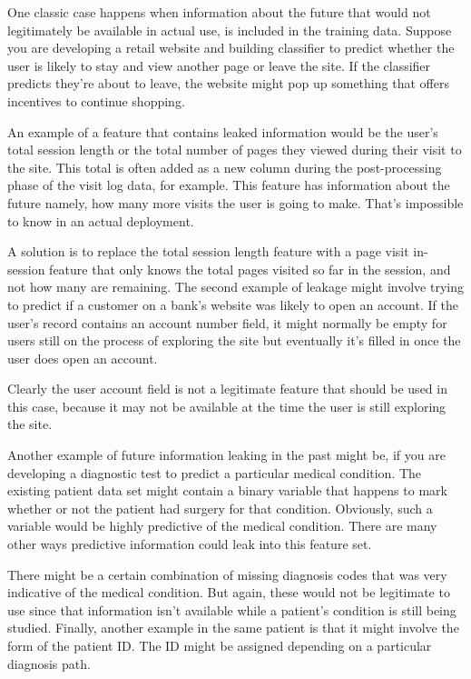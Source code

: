 \begin{multicols}{2}
One classic case happens when information about the future that would not legitimately be available in actual use, is included in the training data. Suppose you are developing a retail website and building classifier to predict whether the user is likely to stay and view another page or leave the site. If the classifier predicts they're about to leave, the website might pop up something that offers incentives to continue shopping. 

An example of a feature that contains leaked information would be the user's total session length or the total number of pages they viewed during their visit to the site. This total is often added as a new column during the post-processing phase of the visit log data, for example. This feature has information about the future namely, how many more visits the user is going to make. That's impossible to know in an actual deployment. 

A solution is to replace the total session length feature with a page visit in-session feature that only knows the total pages visited so far in the session, and not how many are remaining. The second example of leakage might involve trying to predict if a customer on a bank's website was likely to open an account. If the user's record contains an account number field, it might normally be empty for users still on the process of exploring the site but eventually it's filled in once the user does open an account. 

Clearly the user account field is not a legitimate feature that should be used in this case, because it may not be available at the time the user is still exploring the site. 

Another example of future information leaking in the past might be, if you are developing a diagnostic test to predict a particular medical condition. The existing patient data set might contain a binary variable that happens to mark whether or not the patient had surgery for that condition. Obviously, such a variable would be highly predictive of the medical condition. There are many other ways predictive information could leak into this feature set. 

There might be a certain combination of missing diagnosis codes that was very indicative of the medical condition. But again, these would not be legitimate to use since that information isn't available while a patient's condition is still being studied. Finally, another example in the same patient is that it might involve the form of the patient ID. The ID might be assigned depending on a particular diagnosis path. 


\end{multicols}
